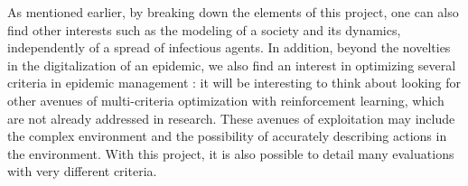 As mentioned earlier, by breaking down the elements of this project, one can also find other interests such as the modeling of a society and its dynamics, independently of a spread of infectious agents. In addition, beyond the novelties in the digitalization of an epidemic, we also find an interest in optimizing several criteria in epidemic management : it will be interesting to think about looking for other avenues of multi-criteria optimization with reinforcement learning, which are not already addressed in research. These avenues of exploitation may include the complex environment and the possibility of accurately describing actions in the environment. With this project, it is also possible to detail many evaluations with very different criteria.\\